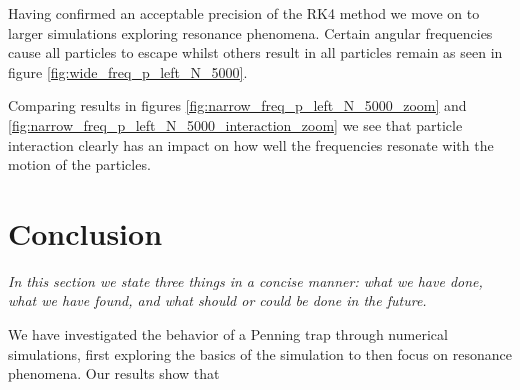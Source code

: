 \documentclass[english,notitlepage,reprint,nofootinbib]{revtex4-1}  %
\begin{document}
Having confirmed an acceptable precision of the RK4 method we move on to larger simulations exploring resonance phenomena. Certain angular frequencies cause all particles to escape whilst others result in all particles remain as seen in figure \ref{fig:wide_freq_p_left_N_5000}.

Comparing results in figures \ref{fig:narrow_freq_p_left_N_5000_zoom} and \ref{fig:narrow_freq_p_left_N_5000_interaction_zoom} we see that particle interaction clearly has an impact on how well the frequencies resonate with the motion of the particles.

\section{Conclusion}\label{sec:conclusion}
\textit{In this section we state three things in a concise manner: what we have done, what we have found, and what should or could be done in the future.}

We have investigated the behavior of a Penning trap through numerical simulations, first exploring the basics of the simulation to then focus on
resonance phenomena. Our results show that
\onecolumngrid

%

\end{document}
